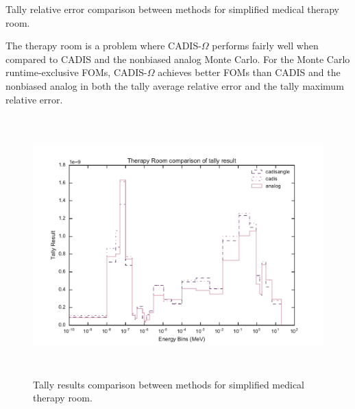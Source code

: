 \begin{table}[h!]
  \centering
  
  \caption[Tally results comparison between methods for simplified medical
  therapy room.]{Tally relative error comparison between methods for simplified
  medical therapy room.}
  \label{tab:therapyfoms}
\end{table}

The therapy room is a problem where CADIS-$\Omega$ performs fairly well when
compared to CADIS and the nonbiased analog Monte Carlo. For the Monte Carlo
runtime-exclusive FOMs, CADIS-$\Omega$ achieves better FOMs than CADIS and the
nonbiased analog in both the tally average relative error and the tally maximum
relative error.

\begin{figure}[h!]
  \centering
  \includegraphics[height=10cm]{./chapters/characterization_probs/figures/char/therapy/therapy_room_tally_result_compare.pdf}
  \caption[Tally results comparison between methods for simplified medical
  therapy room.]
  {Tally results comparison between methods for simplified medical therapy room.}
  \label{fig:therapyresult}
\end{figure}

